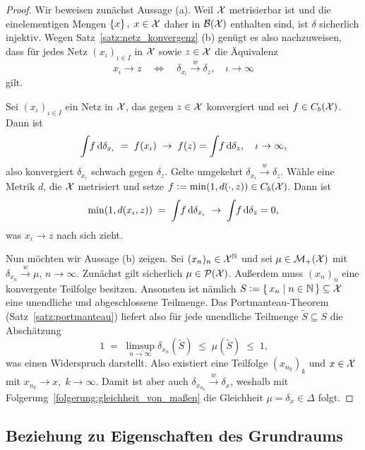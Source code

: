 \documentclass[../main/main.tex]{subfiles}
\begin{document}
	\begin{proof}
		Wir beweisen zunächst Aussage (a). Weil $\mathcal{X}$ metrisierbar ist und die einelementigen Mengen $\left\{x\right\}, \; x \in \mathcal{X}$ daher in $\mathcal{B}(\mathcal{X})$ enthalten sind, ist $\delta$ sicherlich injektiv.
		Wegen Satz~\ref{satz:netz_konvergenz} (b) genügt es also nachzuweisen, dass für jedes Netz $(x_\iota)_{\iota \in I}$ in $\mathcal{X}$ sowie $z \in \mathcal{X}$ die Äquivalenz
		\[ x_\iota \to z \quad \iff \quad \delta_{x_\iota} \xrightarrow{w} \delta_z, \quad \iota \to \infty \]
		gilt. 
		
		Sei  $(x_\iota)_{\iota \in I}$ ein Netz in $\mathcal{X}$, das gegen $z \in \mathcal{X}$ konvergiert und sei $f \in C_b(\mathcal{X})$. Dann ist
		\[ \int_{} \, f \, \mathrm{d}\delta_{x_\iota} \; = \; f(x_\iota) \; \to \; f(z) = \int_{} \, f \, \mathrm{d}\delta_{z}, \quad \iota \to \infty \text{,} \]
		also konvergiert $\delta_{x_\iota}$ schwach gegen $\delta_z$. Gelte umgekehrt $\delta_{x_\iota} \xrightarrow{w} \delta_z$. Wähle eine Metrik $d$, die $\mathcal{X}$ metrisiert und
		setze $f \vcentcolon = \min (1, d(\cdot, z)) \in C_b(\mathcal{X})$. Dann ist 
		\[ \min (1, d(x_\iota, z)) \; = \; \int_{} \, f \, \mathrm{d}\delta_{x_\iota} \; \to \; \int_{} \, f \, \mathrm{d}\delta_{z} = 0 \text{,} \]
		was $x_\iota \to z$ nach sich zieht.
		
		Nun möchten wir Aussage (b) zeigen. Sei $(x_n)_n \in \mathcal{X}^{\mathbb{N}}$ und sei $\mu \in \mathcal{M}_{+}(\mathcal{X})$ mit $\delta_{x_n} \xrightarrow{w} \mu$, $n \to \infty$. Zunächst gilt sicherlich $\mu \in \mathcal{P}(\mathcal{X})$.
		Außerdem muss $(x_n)_n$ eine konvergente Teilfolge besitzen. Ansonsten ist nämlich $S \vcentcolon = \left\{\, x_n \; \middle| \; n \in \mathbb{N} \,\right\} \subseteq \mathcal{X}$ eine unendliche und abgeschlossene Teilmenge. Das Portmanteau-Theorem (Satz~\ref{satz:portmanteau}) liefert also für jede unendliche Teilmenge $\tilde{S} \subseteq S$ die Abschätzung
		\[ 1 \; = \; \limsup_{n \to \infty} \delta_{x_n}(\tilde{S}) \; \leq \; \mu(\tilde{S}) \; \leq \; 1 \text{,} \]
		was einen Widerspruch darstellt. Also existiert eine Teilfolge $(x_{n_k})_k$ und $x \in \mathcal{X}$ mit $x_{n_k} \to x, \; k \to \infty$. Damit ist aber auch $\delta_{x_{n_k}} \xrightarrow{w} \delta_x$, weshalb mit
		Folgerung~\ref{folgerung:gleichheit_von_maßen} die Gleichheit $\mu = \delta_x \in \Delta$ folgt.
	\end{proof}

	\subsection{Beziehung zu Eigenschaften des Grundraums}
	\label{subsec:beziehung_zu_eigenschaften_des_grundraums}
	
\end{document}
